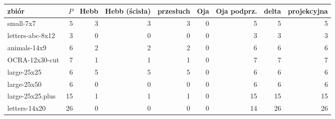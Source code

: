 \begin{tabular}{lrrrrrrrr}

\toprule

zbiór & $P$ & Hebb & Hebb (ścisła) & przesłuch & Oja & Oja podprz. & delta & projekcyjna \\

\midrule

small-7x7 & 5 & 3 & 3 & 3 & 0 & 5 & 5 & 5 \\

letters-abc-8x12 & 3 & 0 & 0 & 0 & 0 & 3 & 3 & 3 \\

animals-14x9 & 6 & 2 & 2 & 2 & 0 & 6 & 6 & 6 \\

OCRA-12x30-cut & 7 & 1 & 1 & 1 & 0 & 7 & 7 & 7 \\

large-25x25 & 6 & 5 & 5 & 5 & 0 & 6 & 6 & 6 \\

large-25x50 & 6 & 0 & 0 & 0 & 0 & 6 & 6 & 6 \\

large-25x25.plus & 15 & 1 & 1 & 1 & 0 & 15 & 15 & 15 \\

letters-14x20 & 26 & 0 & 0 & 0 & 0 & 14 & 26 & 26 \\

\bottomrule

\end{tabular}

